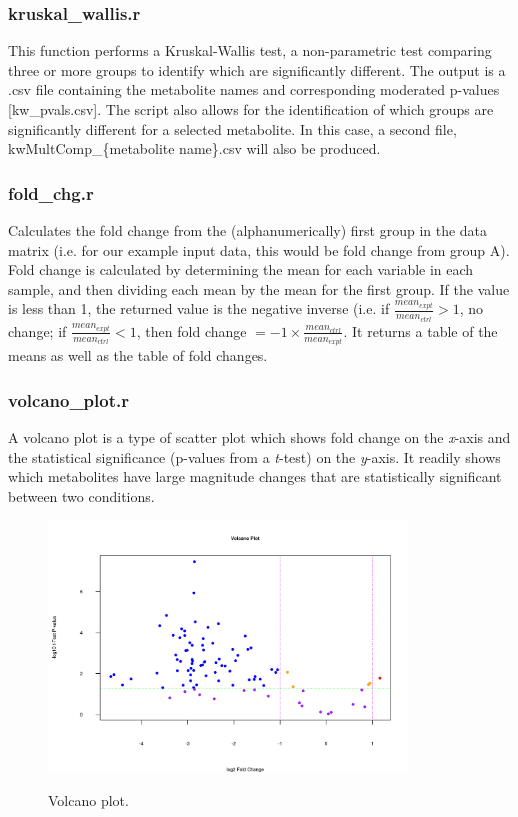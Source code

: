 \documentclass[english,a4paper,12pt]{article}
\begin{document}
\subsubsection*{kruskal\_wallis.r}
This function performs a Kruskal-Wallis test,  a non-parametric test comparing three or more groups to identify which are significantly different. The output is a .csv file containing the metabolite names and corresponding moderated p-values [\textsf{kw\_pvals.csv}]. The script also allows for the identification of which groups are significantly different for a selected metabolite. In this case, a second file, \textsf{kwMultComp\_\{metabolite name\}.csv} will also be produced.

\subsubsection*{fold\_chg.r}
Calculates the fold change from the (alphanumerically) first group in the data matrix (i.e. for our example input data, this would be fold change from group A). Fold change is calculated by determining the mean for each variable in each sample, and then dividing each mean by the mean for the first group. If the value is less than 1, the returned value is the negative inverse (i.e. if
$\frac{mean_{expt}}{mean_{ctrl}} > 1$, no change; if $\frac{mean_{expt}}{mean_{ctrl}} < 1 $, then fold change $= -1\times\frac{mean_{ctrl}}{mean_{expt}}$. It returns a table of the means as well as the table of fold changes.

\subsubsection*{volcano\_plot.r}
A volcano plot is a type of scatter plot which shows fold change on the \emph{x}-axis and the statistical significance (p-values from a \emph{t}-test) on the \emph{y}-axis. It readily shows which metabolites have large magnitude changes that are statistically significant between two conditions.

\begin{figure}[!htb]
    \centering
    \includegraphics[width=0.85\textwidth]{images/volcano_plot.png} \\
    \caption[Volcano plot]{Volcano plot.}
    \label{fig:volcano_plot}
\end{figure}
\end{document}
